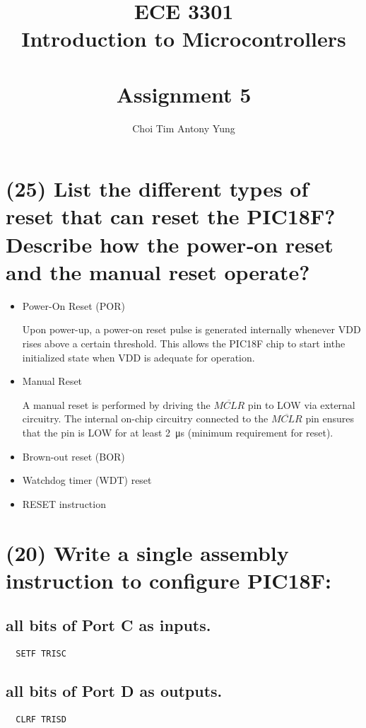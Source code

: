 \documentclass{article}
\title{ECE 3301\\Introduction to Microcontrollers\\\,\\Assignment 5}
\author{Choi Tim Antony Yung}
\begin{document}
\maketitle

\thispagestyle{empty}
\setcounter{page}{0}

\newpage

\section{(25) List the different types of reset that can reset the PIC18F? Describe how the power‐on reset and the manual reset operate?}
\begin{itemize}
  \item Power-On Reset (POR)
  
  Upon power-up, a power-on reset pulse is generated internally whenever VDD rises above a certain threshold. This allows the PIC18F chip to start inthe initialized state when VDD is adequate for operation.\\
  
  \item Manual Reset
  
  A manual reset is performed by driving the $\overline{MCLR}$ pin to LOW via external circuitry. The internal on-chip circuitry connected to the $\overline{MCLR}$ pin ensures that the pin is LOW for at least \SI{2}{\micro\second} (minimum requirement for reset).\\

  \item Brown-out reset (BOR)
  \item Watchdog timer (WDT) reset
  \item RESET instruction
\end{itemize}

\newpage

\section{(20) Write a single assembly instruction to configure PIC18F:}

\subsection{all bits of Port C as inputs.}
\begin{verbatim}
  SETF TRISC
\end{verbatim}
\subsection{all bits of Port D as outputs.}
\begin{verbatim}
  CLRF TRISD
\end{verbatim}
\end{document}
